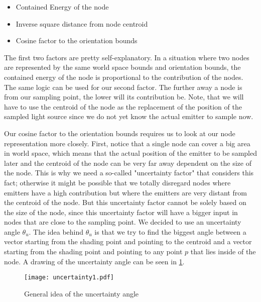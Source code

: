 \begin{itemize}
	\item Contained Energy of the node
	\item Inverse square distance from node centroid
	\item Cosine factor to the orientation bounds
\end{itemize}

The first two factors are pretty self-explanatory. In a situation where two nodes are represented by the same world space bounds and orientation bounds, the contained energy of the node is proportional to the contribution of the nodes. The same logic can be used for our second factor. The further away a node is from our sampling point, the lower will its contribution be. Note, that we will have to use the centroid of the node as the replacement of the position of the sampled light source since we do not yet know the actual emitter to sample now.

Our cosine factor to the orientation bounds requires us to look at our node representation more closely. First, notice that a single node can cover a big area in world space, which means that the actual position of the emitter to be sampled later and the centroid of the node can be very far away dependent on the size of the node. This is why we need a so-called "uncertainty factor" that considers this fact; otherwise it might be possible that we totally disregard nodes where emitters have a high contribution but where the emitters are very distant from the centroid of the node. But this uncertainty factor cannot be solely based on the size of the node, since this uncertainty factor will have a bigger input in nodes that are close to the sampling point. We decided to use an uncertainty angle $\theta_u$. The idea behind $\theta_u$ is that we try to find the biggest angle between a vector starting from the shading point and pointing to the centroid and a vector starting from the shading point and pointing to any point $p$ that lies inside of the node. A drawing of the uncertainty angle can be seen in \ref{fig:uncertainty1}.

\begin{figure}
	\begin{center}
		\texttt{[image: uncertainty1.pdf]}
		\caption{General idea of the uncertainty angle}
		\label{fig:uncertainty1}
	\end{center}
\end{figure}

